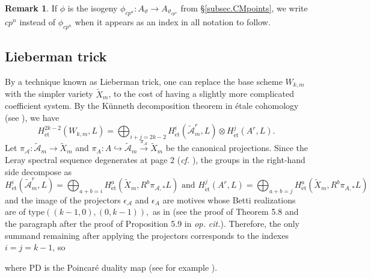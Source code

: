 \documentclass[a4paper]{amsart}
\numberwithin{equation}{section}
\theoremstyle{definition}
\newtheorem{remark}[theorem]{Remark}
\DeclareMathOperator{\et}{\text{\'et}}
\DeclareMathOperator{\TSym}{TSym}
\renewcommand{\et}{\mathrm{\acute{e}t}}
\begin{document}
\begin{remark}
If $\phi$ is the isogeny $\phi_{cp^n}\colon A_{\vartheta}\to A_{\vartheta_{cp^n}}$ from \S\ref{subsec.CMpoints}, we write $cp^n$ instead of $\phi_{cp^n}$ when it appears as an index in all notation to follow.
\end{remark}

\subsection{Lieberman trick}\label{subsec.Lieberman}
By a technique known as Lieberman trick, one can replace the base scheme $W_{k,m}$ with the simpler variety $\widetilde{X}_m$, to the cost of having a slightly more complicated coefficient system. By the Künneth decomposition theorem in étale cohomology (see \cite[Theorem 8.21]{Milne.EC}), we have \[H_{\et}^{2k-2}(W_{k,m},L)=\bigoplus_{i+j=2k-2}H_{\et}^i(\widetilde{\mathcal{A}}_m^r,L)\otimes H_{\et}^j(A^r,L).\]
Let $\pi_{\mathcal{A}}\colon\widetilde{\mathcal{A}}_m\to \widetilde{X}_m$ and $\pi_A\colon A\hookrightarrow\widetilde{\mathcal{A}}_m\stackrel{\pi_\mathcal{A}}{\longrightarrow} \widetilde{X}_m$ be the canonical projections. Since the Leray spectral sequence degenerates at page 2 (\emph{cf.} \cite[\S 2.4]{Deligne.Leray}), the groups in the right-hand side decompose as \[H_{\et}^i(\widetilde{\mathcal{A}}_m^r,L)=\bigoplus_{a+b=i} H^a_{\et}(\widetilde{X}_m,R^b\pi_{\mathcal{A},*}L)\text{ and }H_{\et}^j(A^r,L)=\bigoplus_{a+b=j}H^{a}_{\et}(\widetilde{X}_m,R^{b}\pi_{A,*}L)\] and the image of the projectors $\epsilon_{\mathcal{A}}$ and $\epsilon_A$ are motives whose Betti realizations are of type\linebreak $((k-1,0),(0,k-1)),$ as in \cite{Besser} (see the proof of Theorem 5.8 and the paragraph after the proof of Proposition 5.9 in \emph{op. cit.}). Therefore, the only summand remaining after applying the projectors corresponds to the indexes $i=j=k-1$, so
\begin{center}
\end{center}
where $\mathrm{PD}$ is the Poincaré duality map (see for example \cite[Corollary 11.2]{Milne.EC}).
\end{document}
